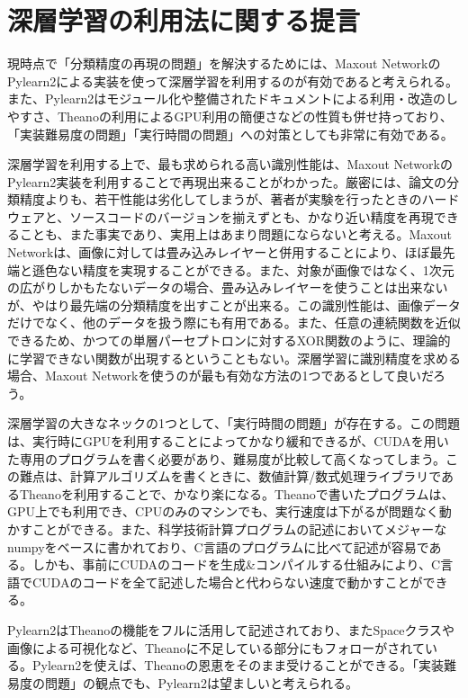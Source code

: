 \section{深層学習の利用法に関する提言}
現時点で「分類精度の再現の問題」を解決するためには、Maxout NetworkのPylearn2による実装を使って深層学習を利用するのが有効であると考えられる。また、Pylearn2はモジュール化や整備されたドキュメントによる利用・改造のしやすさ、Theanoの利用によるGPU利用の簡便さなどの性質も併せ持っており、「実装難易度の問題」「実行時間の問題」への対策としても非常に有効である。\par
深層学習を利用する上で、最も求められる高い識別性能は、Maxout NetworkのPylearn2実装を利用することで再現出来ることがわかった。厳密には、論文の分類精度よりも、若干性能は劣化してしまうが、著者が実験を行ったときのハードウェアと、ソースコードのバージョンを揃えずとも、かなり近い精度を再現できることも、また事実であり、実用上はあまり問題にならないと考える。Maxout Networkは、画像に対しては畳み込みレイヤーと併用することにより、ほぼ最先端と遜色ない精度を実現することができる。また、対象が画像ではなく、1次元の広がりしかもたないデータの場合、畳み込みレイヤーを使うことは出来ないが、やはり最先端の分類精度を出すことが出来る。この識別性能は、画像データだけでなく、他のデータを扱う際にも有用である。また、任意の連続関数を近似できるため、かつての単層パーセプトロンに対するXOR関数のように、理論的に学習できない関数が出現するということもない。深層学習に識別精度を求める場合、Maxout Networkを使うのが最も有効な方法の1つであるとして良いだろう。\par
深層学習の大きなネックの1つとして、「実行時間の問題」が存在する。この問題は、実行時にGPUを利用することによってかなり緩和できるが、CUDAを用いた専用のプログラムを書く必要があり、難易度が比較して高くなってしまう。この難点は、計算アルゴリズムを書くときに、数値計算/数式処理ライブラリであるTheanoを利用することで、かなり楽になる。Theanoで書いたプログラムは、GPU上でも利用でき、CPUのみのマシンでも、実行速度は下がるが問題なく動かすことができる。また、科学技術計算プログラムの記述においてメジャーなnumpyをベースに書かれており、C言語のプログラムに比べて記述が容易である。しかも、事前にCUDAのコードを生成\&コンパイルする仕組みにより、C言語でCUDAのコードを全て記述した場合と代わらない速度で動かすことができる。\par
Pylearn2はTheanoの機能をフルに活用して記述されており、またSpaceクラスや画像による可視化など、Theanoに不足している部分にもフォローがされている。Pylearn2を使えば、Theanoの恩恵をそのまま受けることができる。「実装難易度の問題」の観点でも、Pylearn2は望ましいと考えられる。\par
